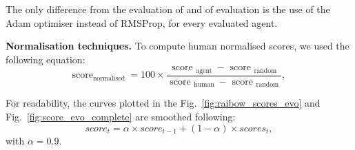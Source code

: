 \documentclass[accepted]{article}
\theoremstyle{plain}
\theoremstyle{definition}
\theoremstyle{remark}
\begin{document}
The only difference from the evaluation of \cite{mnih2015human} and of \cite{van2016deep} evaluation is the use of the Adam optimiser instead of RMSProp, for every evaluated agent.

\textbf{Normalisation techniques.}
To compute human normalised scores, we used the following equation:
\begin{equation}
  \text{score}_{\text {normalised }}= 100 \times \frac{\text { score }_{\text {agent }}-\text { score }_{\text {random }}}{\text { score }_{\text {human }}-\text { score }_{\text {random }}},\label{eq:score_formulae}
\end{equation}


For readability, the curves plotted in the Fig.~\ref{fig:raibow_scores_evo} and Fig.~\ref{fig:score_evo_complete} are smoothed following:
\begin{equation}
    score_t = \alpha \times score_{t-1} + (1-\alpha) \times scores_t,
    \label{eq:smooth}
\end{equation}
with $\alpha = 0.9$.
\end{document}
